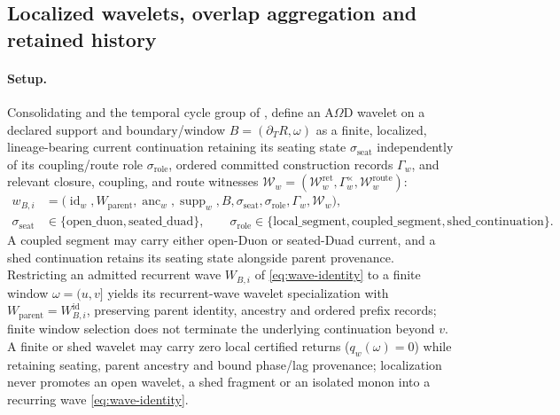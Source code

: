 \subsection{Localized wavelets, overlap aggregation and retained history}
\label{subsec:aod-wavelet-continuation}
\paragraph{Setup.}
Consolidating  and the temporal cycle group
of , define an A\(\Omega\)D wavelet on a
declared support and boundary/window \(B=(\partial_T R,\omega)\) as a finite,
localized, lineage-bearing current continuation retaining its seating state
\(\sigma_{\mathrm{seat}}\) independently of its coupling/route role
\(\sigma_{\mathrm{role}}\), ordered committed construction records \(\Gamma_w\),
and relevant closure, coupling, and route witnesses
\(\mathcal W_w=(\mathcal W_w^{\mathrm{ret}},\Gamma^\times_w,\mathcal W_w^{\mathrm{route}})\):
\begin{equation}
\begin{split}
w_{B,i}&=\bigl(\operatorname{id}_w,W_{\mathrm{parent}},\operatorname{anc}_w,\operatorname{supp}_w,B,\sigma_{\mathrm{seat}},\sigma_{\mathrm{role}},\Gamma_w,\mathcal W_w\bigr),\\
\sigma_{\mathrm{seat}}&\in\{\mathrm{open\_duon},\mathrm{seated\_duad}\},\qquad
\sigma_{\mathrm{role}}\in\{\mathrm{local\_segment},\mathrm{coupled\_segment},\mathrm{shed\_continuation}\}.
\end{split}
\label{eq:aod-wavelet-continuation}
\end{equation}
A coupled segment may carry either open-Duon or seated-Duad current, and a shed
continuation retains its seating state alongside parent provenance. Restricting
an admitted recurrent wave \(W_{B,i}\) of \eqref{eq:wave-identity} to a finite
window \(\omega=(u,v]\) yields its recurrent-wave wavelet specialization with
\(W_{\mathrm{parent}}=W^{\mathrm{id}}_{B,i}\), preserving parent identity,
ancestry and ordered prefix records; finite window selection does not terminate
the underlying continuation beyond \(v\). A finite or shed wavelet may carry
zero local certified returns (\(q_w(\omega)=0\)) while retaining seating, parent
ancestry and bound phase/lag provenance; localization never promotes an open
wavelet, a shed fragment or an isolated monon into a recurring wave
\eqref{eq:wave-identity}.


